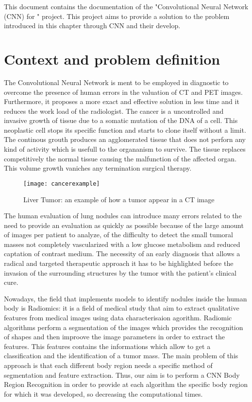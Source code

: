 \documentclass[../main.tex]{subfiles}
\begin{document}
\thispagestyle{empty}
This document contains the documentation of the "Convolutional Neural Network (CNN) for " project. This project aims to provide a solution to the problem introduced in this chapter through CNN and their develop.

\section{Context and problem definition}
The Convolutional Neural Network is ment to be employed in diagnostic to overcome the presence of human errors in the valuation of CT and PET images. Furthermore, it proposes a more exact and effective solution in less time and it reduces the work load of the radiologist.
The cancer is a uncontrolled and invasive growth of tissue due to a somatic mutation of the DNA of a cell. This neoplastic cell stops its specific function and starts to clone itself without a limit. The continous grouth produces an agglomerated tissue that does not perforn any kind of activity which is usefull to the organanism to survive. The tissue replaces competitively the normal tissue causing the malfunction of the affected organ. This volume growth vaniches any termination surgical therapy.

\begin{figure}[htbp] 
\centering 
\texttt{[image: cancerexample]}
\caption{Liver Tumor: an example of how a tumor appear in a CT image} 
\label{cancerexample} 
\vspace{5mm}
\end{figure}

The human evaluation of lung nodules can introduce many errors related to the need to provide an evaluation as quickly as possible because of the large amount of images per patient to analyze, of the difficulty to detect the small tumoral masses not completely vascularized with a low glucose metabolism and reduced captation of contrast medium.
The necessity of an early diagnosis that allows a radical and targeted therapeutic approach it has to be highlighted before the invasion of the  surrounding structures by the tumor with the patient's clinical cure.
\vspace{5mm}

Nowadays, the field that implements models to identify nodules inside the human body is Radiomics: it is a field of medical study that aim to extract qualitative features from medical images using data characterisaion agorithm.
Radiomic algorithms perform a segmentation of the images which provides the recognition of shapes and then improove the image parameters in order to extract the features. This features contains the informations which allow to get a classification and the identification of a tumor mass.
The main problem of this approach is that each different body region needs a specific method of segmentation and feature extraction. Thus, our aim is to perform a CNN Body Region Recognition in order to provide at each algorithm the specific body region for which it was developed, so decreasing the computational times.
\end{document}
